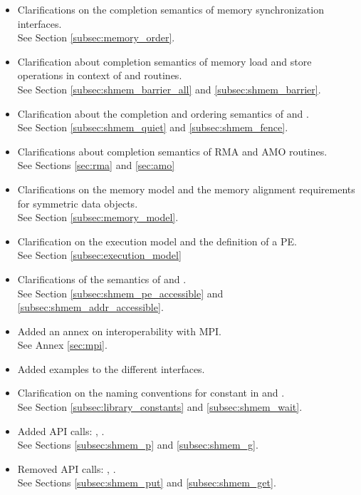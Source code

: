 \begin{itemize}
\item Clarifications on the completion semantics of memory synchronization 
interfaces.\\See Section \ref{subsec:memory_order}.
\item Clarification about completion semantics of memory load and store 
operations in context of  and  
routines.\\See Section \ref{subsec:shmem_barrier_all} and \ref{subsec:shmem_barrier}.
\item Clarification about the completion and ordering semantics of  and .
\\See Section \ref{subsec:shmem_quiet} and \ref{subsec:shmem_fence}.
\item Clarifications about completion semantics of \ac{RMA} and \ac{AMO} routines.
\\See Sections \ref{sec:rma} and \ref{sec:amo}
\item Clarifications on the memory model and the memory alignment requirements for symmetric data objects.
\\See Section \ref{subsec:memory_model}.
\item Clarification on the execution model and the definition of a \ac{PE}.
\\See Section \ref{subsec:execution_model}
\item Clarifications of the semantics of  and .
\\See Section \ref{subsec:shmem_pe_accessible} and \ref{subsec:shmem_addr_accessible}.
\item Added an annex on interoperability with \ac{MPI}.\\See Annex \ref{sec:mpi}.
\item Added examples to the different interfaces.
\item Clarification on the naming conventions for constant in \Clang{} and \Fortran{}.
\\See Section \ref{subsec:library_constants} and \ref{subsec:shmem_wait}.
\item Added \ac{API} calls: , .\\See \cbstart Sections \ref{subsec:shmem_p} and \ref{subsec:shmem_g}. \cbend
\item Removed \ac{API} calls: , .\\ See \cbstart Sections \cbend \ref{subsec:shmem_put} and \ref{subsec:shmem_get}. 

\end{itemize}

